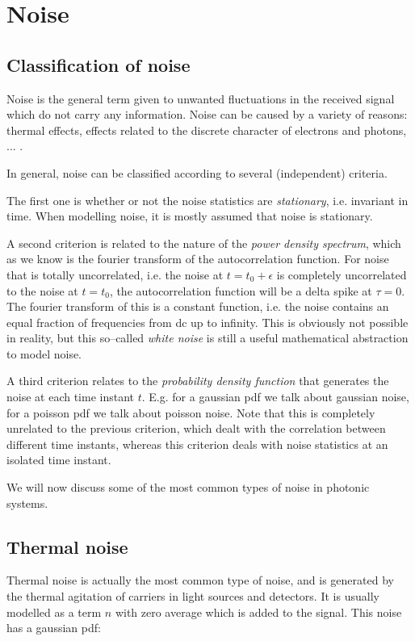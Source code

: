 \section{Noise}

\subsection{Classification of noise}

Noise is the general term given to unwanted fluctuations in the received signal which do not carry any information. Noise can be caused by a variety of reasons: thermal effects, effects related to the discrete character of electrons and photons, ... .

In general, noise can be classified according to several (independent) criteria.

The first one is whether or not the noise statistics are \emph{stationary}, i.e. invariant in time. When modelling noise, it is mostly assumed that noise is stationary.

A second criterion is related to the nature of the \emph{power density spectrum}, which as we know is the fourier transform of the autocorrelation function. For noise that is totally uncorrelated, i.e. the noise at $t=t_0+\epsilon$ is completely uncorrelated to the noise at $t=t_0$, the autocorrelation function will be a delta spike at $\tau=0$. The fourier transform of this is a constant function, i.e. the noise contains an equal fraction of frequencies from dc up to infinity. This is obviously not possible in reality, but this so--called \emph{white noise} is still a useful mathematical abstraction to model noise.

A third criterion relates to the \emph{probability density function} that generates the noise at each time instant $t$. E.g. for a gaussian pdf we talk about gaussian noise, for a poisson pdf we talk about poisson noise. Note that this is completely unrelated to the previous criterion, which dealt with the correlation between different time instants, whereas this criterion deals with noise statistics at an isolated time instant.

We will now discuss some of the most common types of noise in photonic systems.

\subsection{Thermal noise}

Thermal noise is actually the most common type of noise, and is generated by the thermal agitation of carriers in light sources and detectors. It is usually modelled as a term $n$ with zero average which is added to the signal. This noise has a gaussian pdf:

